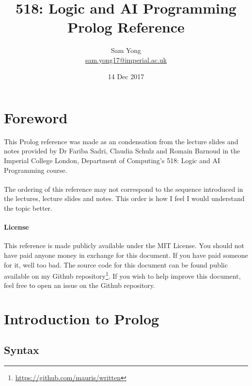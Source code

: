 \documentclass{article}
\title{
	 \large 518: Logic and AI Programming \\
	 \huge Prolog Reference
}
\date{14 Dec 2017}
\author{
	Sam Yong \\
	\small \href{mailto:sam.yong17@imperial.ac.uk}{sam.yong17@imperial.ac.uk}
}
\begin{document}
  \maketitle
  
  \begin{multicols}{2}
  
  \section*{Foreword}  
  
  \paragraph{} This Prolog reference was made as an condensation from the lecture slides and notes provided by Dr Fariba Sadri, Claudia Schulz and Romain Barnoud in the Imperial College London, Department of Computing's 518: Logic and AI Programming course.
  
  \paragraph{} The ordering of this reference may not correspond to the sequence introduced in the lectures, lecture slides and notes. This order is how I feel I would understand the topic better.
  
  \begin{footnotesize}
  \paragraph{License} This reference is made publicly available under the MIT License. You should not have paid anyone money in exchange for this document. If you have paid someone for it, well too bad. The source code for this document can be found public available on my Github repository\footnote{\href{https://github.com/mauris/written}{https://github.com/mauris/written}}. If you wish to help improve this document, feel free to open an issue on the Github repository.
  \end{footnotesize}
  
  \section{Introduction to Prolog}
  
  \subsection{Syntax}
  

\end{multicols}
\end{document}
